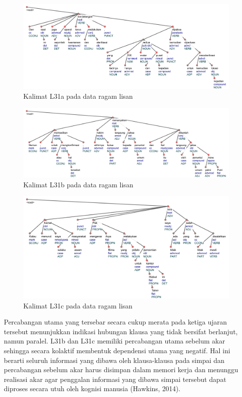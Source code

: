 \begin{figure}
	\centering \includegraphics[width=1
	\textwidth] {pics/ls1716.jpg} 
	\caption{Kalimat L31a pada data ragam lisan} 
	\label{fig:ls1716} 
\end{figure}

\begin{figure}
	\centering \includegraphics[width=1
	\textwidth] {pics/ls16.jpg} 
	\caption{Kalimat L31b pada data ragam lisan}
	\label{fig:ls16} 
\end{figure}

\begin{figure}
	\centering \includegraphics[width=1
	\textwidth] {pics/ls114.jpg} 
	\caption{Kalimat L31c pada data ragam lisan}
	\label{fig:ls114} 
\end{figure}

Percabangan utama yang tersebar secara cukup merata pada ketiga ujaran tersebut menunjukkan indikasi hubungan klausa yang tidak bersifat berlanjut, namun paralel. L31b dan L31c memiliki percabangan utama sebelum akar sehingga secara kolaktif membentuk dependensi utama yang negatif. Hal ini berarti seluruh informasi yang dibawa oleh klausa-klausa pada simpai dan percabangan sebelum akar harus disimpan dalam memori kerja dan menunggu realisasi akar agar penggalan informasi yang dibawa simpai tersebut dapat diproses secara utuh oleh kognisi manusia (Hawkins, 2014).

